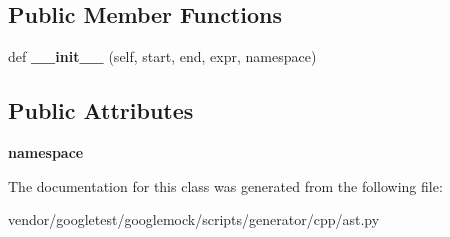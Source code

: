\subsection*{Public Member Functions}
\begin{DoxyCompactItemize}
\item 
\mbox{\label{classcpp_1_1ast_1_1_friend_a9fe245d0f14eaab85435e942a56de7e6}} 
def {\bfseries \+\_\+\+\_\+init\+\_\+\+\_\+} (self, start, end, expr, namespace)
\end{DoxyCompactItemize}
\subsection*{Public Attributes}
\begin{DoxyCompactItemize}
\item 
\mbox{\label{classcpp_1_1ast_1_1_friend_a076c68dddae9bd1e24d224d005538014}} 
{\bfseries namespace}
\end{DoxyCompactItemize}


The documentation for this class was generated from the following file\+:\begin{DoxyCompactItemize}
\item 
vendor/googletest/googlemock/scripts/generator/cpp/ast.\+py\end{DoxyCompactItemize}
